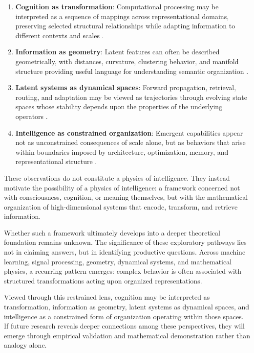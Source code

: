 \begin{enumerate}
\item \textbf{Cognition as transformation}: Computational processing may be interpreted as a sequence of mappings across representational domains, preserving selected structural relationships while adapting information to different contexts and scales \cite{mallat2012group}.

\item \textbf{Information as geometry}: Latent features can often be described geometrically, with distances, curvature, clustering behavior, and manifold structure providing useful language for understanding semantic organization \cite{bronstein2021geometric}.

\item \textbf{Latent systems as dynamical spaces}: Forward propagation, retrieval, routing, and adaptation may be viewed as trajectories through evolving state spaces whose stability depends upon the properties of the underlying operators \cite{scellier2017equilibrium, pennington2017nonlinear}.

\item \textbf{Intelligence as constrained organization}: Emergent capabilities appear not as unconstrained consequences of scale alone, but as behaviors that arise within boundaries imposed by architecture, optimization, memory, and representational structure \cite{pennington2017nonlinear}.
\end{enumerate}

These observations do not constitute a physics of intelligence. They instead motivate the possibility of a physics of intelligence: a framework concerned not with consciousness, cognition, or meaning themselves, but with the mathematical organization of high-dimensional systems that encode, transform, and retrieve information.

Whether such a framework ultimately develops into a deeper theoretical foundation remains unknown. The significance of these exploratory pathways lies not in claiming answers, but in identifying productive questions. Across machine learning, signal processing, geometry, dynamical systems, and mathematical physics, a recurring pattern emerges: complex behavior is often associated with structured transformations acting upon organized representations.

Viewed through this restrained lens, cognition may be interpreted as transformation, information as geometry, latent systems as dynamical spaces, and intelligence as a constrained form of organization operating within those spaces. If future research reveals deeper connections among these perspectives, they will emerge through empirical validation and mathematical demonstration rather than analogy alone.


